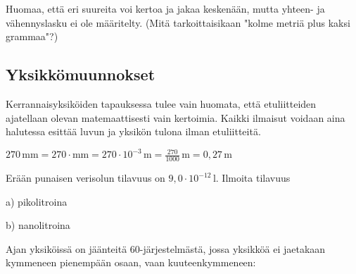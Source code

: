 
Huomaa, että eri suureita voi kertoa ja jakaa keskenään, mutta yhteen- ja vähennyslasku ei ole määritelty. (Mitä tarkoittaisikaan "kolme metriä plus kaksi grammaa"?)



\subsection*{Yksikkömuunnokset}

Kerrannaisyksiköiden tapauksessa tulee vain huomata, että etuliitteiden ajatellaan olevan matemaattisesti vain kertoimia. Kaikki ilmaisut voidaan aina halutessa esittää luvun ja yksikön tulona ilman etuliitteitä.

\begin{esimerkki}
$270\,\text{mm}=270\cdot\text{mm}=270\cdot10^{-3}\,\text{m}=\frac{270}{1000}\,\text{m}=0,27\,\text{m}$
\end{esimerkki}

\begin{esimerkki}
Erään punaisen verisolun tilavuus on $9,0 \cdot 10^{-12}\,\textrm{l}$. Ilmoita tilavuus

a) pikolitroina

b) nanolitroina

\begin{esimratk}
$9,0 \cdot 10^{-12}\,\textrm{l} = 9,0\,\textrm{pl} = 0,009{,\textrm{nl}$.
\end{esimratk}
\end{esimerkki}

Ajan yksiköissä on jäänteitä 60-järjestelmästä, jossa yksikköä ei jaetakaan kymmeneen pienempään osaan, vaan kuuteenkymmeneen:


